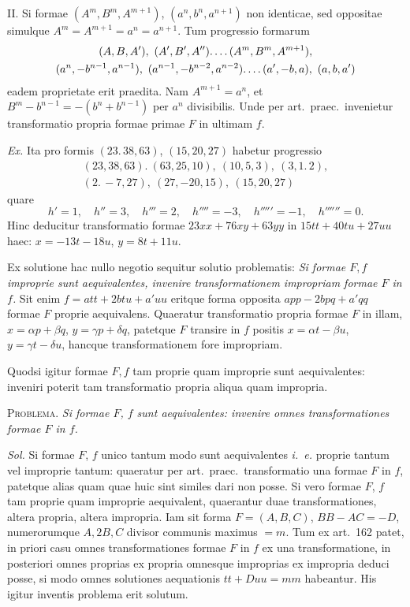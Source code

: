 II. Si formae $(A^m,B^m,A^{m+1})$, $(a^n,b^n,a^{n+1})$ non identicae, sed oppositae simulque $A^m=A^{m+1}=a^n=a^{n+1}$. Tum progressio formarum
\[
\begin{gathered}
(A,B,A'),\ (A',B',A'')\ldotp\ldotp\ldotp\ldotp(A^m,B^m,A^{m+1}),\\
(a^n,-b^{n-1},a^{n-1}),\ (a^{n-1},-b^{n-2},a^{n-2})\ldotp\ldotp\ldotp\ldotp(a',-b,a),\ (a,b,a')
\end{gathered}
\]
eadem proprietate erit praedita. Nam $A^{m+1}=a^n$, et $B^m-b^{n-1}=-(b^n+b^{n-1})$ per $a^n$ divisibilis. Unde per art.\ praec.\ invenietur transformatio propria formae primae $F$ in ultimam $f$.

\emph{Ex.} Ita pro formis $(23.\,38,63)$, $(15,20,27)$ habetur progressio
\[
\begin{gathered}
(23,38,63).\ (63,25,10),\ (10,5,3),\ (3,1.\,2),\\
(2.\,-7,27),\ (27,-20,15),\ (15,20,27)
\end{gathered}
\]
quare
\[
h'=1,\quad h''=3,\quad h'''=2,\quad h''''=-3,\quad h'''''=-1,\quad h''''''=0.
\]
Hinc deducitur transformatio formae $23xx+76xy+63yy$ in $15tt+40tu+27uu$ haec: $x=-13t-18u$, $y=8t+11u$.

Ex solutione hac nullo negotio sequitur solutio problematis: \emph{Si formae $F,f$ improprie sunt aequivalentes, invenire transformationem impropriam formae $F$ in $f$.} Sit enim $f=att+2btu+a'uu$ eritque forma opposita $app-2bpq+a'qq$ formae $F$ proprie aequivalens. Quaeratur transformatio propria formae $F$ in illam, $x=\alpha p+\beta q$, $y=\gamma p+\delta q$, patetque $F$ transire in $f$ positis $x=\alpha t-\beta u$, $y=\gamma t-\delta u$, hancque transformationem fore impropriam.

Quodsi igitur formae $F,f$ tam proprie quam improprie sunt aequivalentes: inveniri poterit tam transformatio propria aliqua quam impropria.

\textsc{Problema.} \emph{Si formae $F$, $f$ sunt aequivalentes: invenire omnes transformationes formae $F$ in $f$.}

\emph{Sol.} Si formae $F$, $f$ unico tantum modo sunt aequivalentes \emph{i.\ e.} proprie tantum vel improprie tantum: quaeratur per art.\ praec.\ transformatio una formae $F$ in $f$, patetque alias quam quae huic sint similes dari non posse. Si vero formae $F$, $f$ tam proprie quam improprie aequivalent, quaerantur duae transformationes, altera propria, altera impropria. Iam sit forma $F=(A,B,C)$, $BB-AC=-D$, numerorumque $A,2B,C$ divisor communis maximus $=m$. Tum ex art.\ 162 patet, in priori casu omnes transformationes formae $F$ in $f$ ex una transformatione, in posteriori omnes proprias ex propria omnesque improprias ex impropria deduci posse, si modo omnes solutiones aequationis $tt+Duu=mm$ habeantur. His igitur inventis problema erit solutum.

